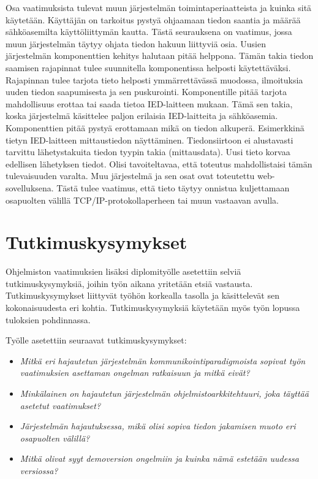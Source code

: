 Osa vaatimuksista tulevat muun järjestelmän toimintaperiaatteista ja kuinka sitä käytetään. Käyttäjän on tarkoitus pystyä ohjaamaan tiedon saantia ja määrää sähköasemilta käyttöliittymän kautta. Tästä seurauksena on vaatimus, jossa muun järjestelmän täytyy ohjata tiedon hakuun liittyviä osia. Uusien järjestelmän komponenttien kehitys halutaan pitää helppona. Tämän takia tiedon saamisen rajapinnat tulee suunnitella komponentissa helposti käytettäväksi. Rajapinnan tulee tarjota tieto helposti ymmärrettävässä muodossa, ilmoituksia uuden tiedon saapumisesta ja sen puskurointi. Komponentille pitää tarjota mahdollisuus erottaa tai saada tietoa IED-laitteen mukaan. Tämä sen takia, koska järjestelmä käsittelee paljon erilaisia IED-laitteita ja sähköasemia. Komponenttien pitää pystyä erottamaan mikä on tiedon alkuperä. Esimerkkinä tietyn IED-laitteen mittaustiedon näyttäminen. Tiedonsiirtoon ei alustavasti tarvittu lähetystakuita tiedon tyypin takia (mittausdata). Uusi tieto korvaa edellisen lähetyksen tiedot. Olisi tavoiteltavaa, että toteutus mahdollistaisi tämän tulevaisuuden varalta. Muu järjestelmä ja sen osat ovat toteutettu web-sovelluksena. Tästä tulee vaatimus, että tieto täytyy onnistua kuljettamaan osapuolten välillä TCP/IP-protokollaperheen tai muun vastaavan avulla.


\section{Tutkimuskysymykset}
Ohjelmiston vaatimuksien lisäksi diplomityölle asetettiin selviä tutkimuskysymyksiä, joihin työn aikana yritetään etsiä vastausta. Tutkimuskysymykset liittyvät työhön korkealla tasolla ja käsittelevät sen kokonaisuudesta eri kohtia. Tutkimuskysymyksiä käytetään myös työn lopussa tuloksien pohdinnassa.

Työlle asetettiin seuraavat tutkimuskysymykset:
\begin{itemize}
	\item \emph{Mitkä eri hajautetun järjestelmän kommunikointiparadigmoista sopivat työn vaatimuksien asettaman ongelman ratkaisuun ja mitkä eivät?}
	\item \emph{Minkälainen on hajautetun järjestelmän ohjelmistoarkkitehtuuri, joka täyttää asetetut vaatimukset?}
	\item \emph{Järjestelmän hajautuksessa, mikä olisi sopiva tiedon jakamisen muoto eri osapuolten välillä?}
	\item \emph{Mitkä olivat syyt demoversion ongelmiin ja kuinka nämä estetään uudessa versiossa?}
\end{itemize}